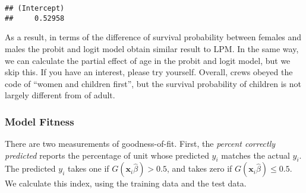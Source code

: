 \documentclass[
  12pt,
]{article}
\begin{document}
\begin{verbatim}
## (Intercept) 
##     0.52958
\end{verbatim}

As a result,
in terms of the difference of survival probability between females and males
the probit and logit model obtain similar result to LPM.
In the same way, we can calculate the partial effect of age in the probit and logit model,
but we skip this.
If you have an interest, please try yourself.
Overall, crews obeyed the code of ``women and children first'',
but the survival probability of children is not largely different from of adult.

\hypertarget{model-fitness}{%
\subsubsection{Model Fitness}\label{model-fitness}}

There are two measurements of goodness-of-fit.
First, the \emph{percent correctly predicted} reports
the percentage of unit whose predicted \(y_i\) matches the actual \(y_i\).
The predicted \(y_i\) takes one if \(G(\mathbf{x}_i \hat{\beta}) > 0.5\),
and takes zero if \(G(\mathbf{x}_i \hat{\beta}) \le 0.5\).
We calculate this index, using the training data and the test data.
\end{document}
